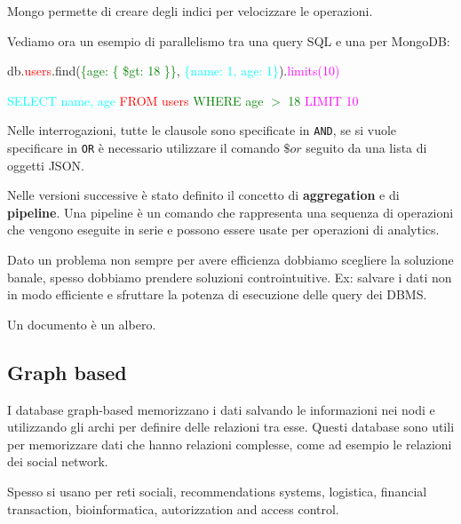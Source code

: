 Mongo permette di creare degli indici per velocizzare le operazioni.
\begin{esempio}
      Vediamo ora un esempio di parallelismo tra una query SQL e una per
      MongoDB:
      \begin{center}
            db.\textcolor{red}{users}.find(\textcolor{green}{\{age: \{ \$gt: 18 \}\}},
            \textcolor{cyan}{\{name: 1, age: 1\}}).\textcolor{magenta}{limits(10)}
      \end{center}
      \begin{center}
            \textcolor{cyan}{SELECT name, age} \textcolor{red}{FROM users}
            \textcolor{green}{WHERE age $>$ 18} \textcolor{magenta}{LIMIT 10}
      \end{center}
\end{esempio}
Nelle interrogazioni, tutte le clausole sono specificate in \texttt{AND}, se si
vuole specificare in \texttt{OR} è necessario utilizzare il comando $\$or$ seguito
      da una lista di oggetti JSON.

      Nelle versioni successive è stato definito il concetto di \textbf{aggregation} e
      di \textbf{pipeline}. Una pipeline è un comando che rappresenta una sequenza di
      operazioni che vengono eseguite in serie e possono essere usate per operazioni
      di analytics.

      \begin{nota}
            Dato un problema non sempre per avere efficienza dobbiamo scegliere la
            soluzione banale, spesso dobbiamo prendere soluzioni controintuitive. Ex:
            salvare i dati non in modo efficiente e sfruttare la potenza di esecuzione
            delle query dei DBMS.
      \end{nota}
      \begin{nota}
            Un documento è un albero.
      \end{nota}
      \subsection{Graph based}
      I database graph-based memorizzano i dati salvando le informazioni nei nodi e
      utilizzando gli archi per definire delle relazioni tra esse. Questi database sono
      utili per memorizzare dati che hanno relazioni complesse, come ad esempio le
      relazioni dei social network.

      Spesso si usano per reti sociali, recommendations systems, logistica, financial
      transaction, bioinformatica, autorizzation and access control.

